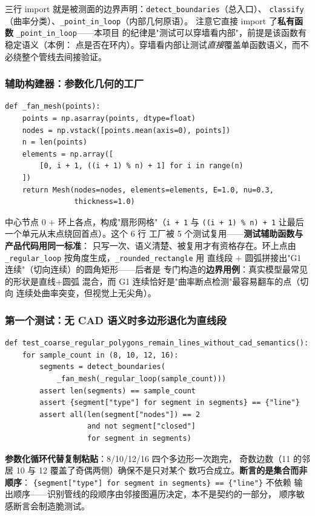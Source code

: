 \documentclass[12pt,a4paper]{ctexart}
\newcommand{\fem}{\Verb}
\begin{document}
三行 import 就是被测面的边界声明：\fem|detect_boundaries|（总入口）、
\fem|classify|（曲率分类）、\fem|_point_in_loop|（内部几何原语）。
注意它直接 import 了\textbf{私有函数} \fem|_point_in_loop|——本项目
的纪律是"测试可以穿墙看内部"，前提是该函数有稳定语义（本例：
点是否在环内）。穿墙看内部让测试\emph{直接}覆盖单函数语义，而不
必绕整个管线去间接验证。

\subsubsection{辅助构建器：参数化几何的工厂}

\begin{lstlisting}
def _fan_mesh(points):
    points = np.asarray(points, dtype=float)
    nodes = np.vstack([points.mean(axis=0), points])
    n = len(points)
    elements = np.array([
        [0, i + 1, ((i + 1) % n) + 1] for i in range(n)
    ])
    return Mesh(nodes=nodes, elements=elements, E=1.0, nu=0.3,
                thickness=1.0)
\end{lstlisting}

中心节点 0 + 环上各点，构成"扇形网格"（\fem|i + 1| 与
\fem|((i + 1) %
工厂被 5 个测试复用——\textbf{测试辅助函数与产品代码用同一标准}：
只写一次、语义清楚、被复用才有资格存在。环上点由
\fem|_regular_loop| 按角度生成，\fem|_rounded_rectangle| 用
直线段 + 圆弧拼接出"G1 连续"（切向连续）的圆角矩形——后者是
专门构造的\textbf{边界用例}：真实模型最常见的形状是直线+圆弧
混合，而 G1 连续恰好是"曲率断点检测"最容易翻车的点（切向
连续处曲率突变，但视觉上无尖角）。

\subsubsection{第一个测试：无 CAD 语义时多边形退化为直线段}

\begin{lstlisting}
def test_coarse_regular_polygons_remain_lines_without_cad_semantics():
    for sample_count in (8, 10, 12, 16):
        segments = detect_boundaries(
            _fan_mesh(_regular_loop(sample_count)))
        assert len(segments) == sample_count
        assert {segment["type"] for segment in segments} == {"line"}
        assert all(len(segment["nodes"]) == 2
                   and not segment["closed"]
                   for segment in segments)
\end{lstlisting}

\textbf{参数化循环代替复制粘贴}：8/10/12/16 四个多边形一次跑完，
奇数边数（11 的邻居 10 与 12 覆盖了奇偶两侧）确保不是只对某个
数巧合成立。\textbf{断言的是集合而非顺序}：
\fem|{segment["type"] for segment in segments} == {"line"}| 不依赖
输出顺序——识别管线的段顺序由邻接图遍历决定，本不是契约的一部分，
顺序敏感断言会制造脆测试。
\end{document}
